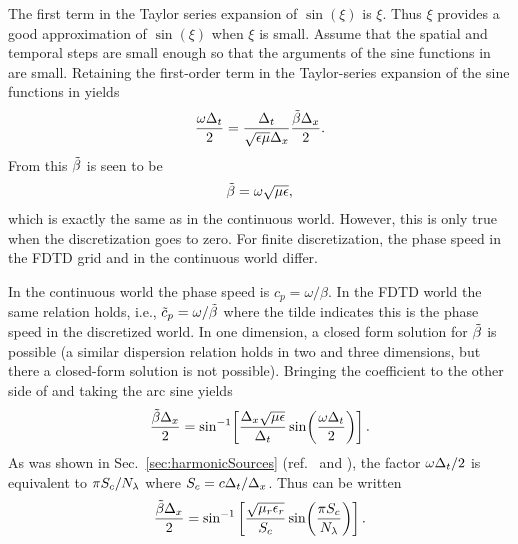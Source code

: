 The first term in the Taylor series expansion of $\sin(\xi)$ is $\xi$.
Thus $\xi$ provides a good approximation of $\sin(\xi)$ when $\xi$ is
small.  Assume that the spatial and temporal steps are small enough so
that the arguments of the sine functions in  are
small.  Retaining the first-order term in the Taylor-series expansion
of the sine functions in  yields
\begin{equation}
  \frac{\omega\Delta_t}{2} =
  \frac{\Delta_t}{\sqrt{\epsilon\mu}\Delta_x}
  \frac{\tilde{\beta}\Delta_x}{2}.
\end{equation}
From this $\tilde{\beta}$ is seen to be
\begin{equation}
 \tilde{\beta} = \omega\sqrt{\mu\epsilon},
\end{equation}
which is exactly the same as in the continuous world.  However, this
is only true when the discretization goes to zero.  For finite
discretization, the phase speed in the FDTD grid and in the continuous
world differ.

In the continuous world the phase speed is $c_p=\omega/\beta$.  In the
FDTD world the same relation holds, i.e., $\tilde{c}_p=\omega/\tilde{\beta}$
where the tilde indicates this is the phase speed in the discretized
world.  In one dimension, a closed form solution for $\tilde{\beta}$ is possible
(a similar dispersion relation holds in two and three dimensions, but
there a closed-form solution is not possible).  Bringing the
coefficient to the other side of  and taking the
arc sine yields
\begin{equation}
  \frac{\tilde{\beta}\Delta_x}{2} = \sin^{-1}\!\left[
     \frac{\Delta_x\sqrt{\mu\epsilon}}{\Delta_t}
     \sin\!\left(\frac{\omega\Delta_t}{2}\right)\right].
  \label{eq:tbeta}
\end{equation}
As was shown in Sec.\ \ref{sec:harmonicSources} (ref.\
 and ), the factor
$\omega\Delta_t/2$ is equivalent to $\pi S_c/N_\lambda$ where
$S_c=c\Delta_t/\Delta_x$.  Thus  can be written
\begin{equation}
  \frac{\tilde{\beta}\Delta_x}{2} = \sin^{-1}\left[
    \frac{\sqrt{\mu_r\epsilon_r}}{S_c}
    \sin\!\left(\frac{\pi S_c}{N_\lambda}\right)\right].
  \label{eq:tbetaI}
\end{equation}

